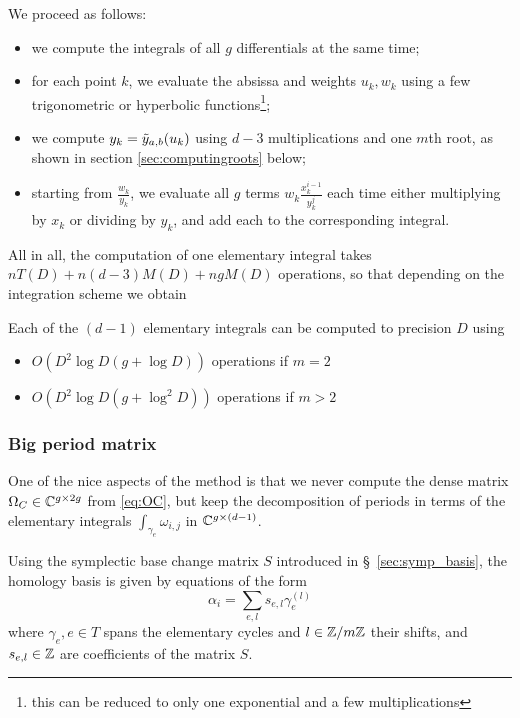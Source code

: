 \documentclass[main.tex]{subfiles}
\begin{document}
   We proceed as follows:
   \begin{itemize}
       \item we compute the integrals of all $g$ differentials at the same time;
   \item for each point $k$, we evaluate the absissa and weights $u_k,w_k$ using
       a few trigonometric or hyperbolic functions\footnote{this can be reduced to only one exponential
       and a few multiplications};
   \item we compute $y_k=\tilde{y}_{a,b}(u_k)$ using $d-3$ multiplications and one $m$th root,
       as shown in section \ref{sec:computingroots} below;
   \item starting from $\frac{w_k}{y_k}$, we evaluate all $g$ terms $w_k\frac{x_k^{i-1}}{y_k^j}$
       each time either multiplying by $x_k$ or dividing by $y_k$, and add each to the corresponding
       integral.
   \end{itemize}

   All in all, the computation of one elementary integral takes $nT(D)+n(d-3)M(D)+ngM(D)$ operations,
   so that depending on the integration scheme we obtain
   \begin{thm}
       \label{thm:complexity_integrals}
       Each of the $(d-1)$ elementary integrals can be computed to precision $D$ using
       \begin{itemize}
           \item $O(D^2\log D (g + \log D))$ operations if $m=2$
           \item $O(D^2\log D (g + \log^2 D))$ operations if $m>2$
       \end{itemize}
   \end{thm}

   \subsubsection{Big period matrix}

   One of the nice aspects of the method is that we never compute
   the dense matrix $\Omega_C\in\mathbb{C}^{g\times 2g}$ from \eqref{eq:OC}, but
   keep the decomposition of periods in terms of the elementary integrals
   $\int_{\gamma_e}\omega_{i,j}$ in $\mathbb{C}^{g\times (d-1)}$.

   Using the symplectic base change matrix $S$ introduced
   in \S~\ref{sec:symp_basis}, the homology basis is given
   by equations of the form
   \begin{equation}
       \label{eq:base_change_cycles}
       \alpha_i = \sum_{e,l} s_{e,l}\gamma_e^{(l)}
   \end{equation}
   where $\gamma_e,e\in T$ spans the elementary cycles
   and $l\in\mathbb{Z}/m\mathbb{Z}$ their shifts,
   and $s_{e,l}\in\mathbb{Z}$ are coefficients of the matrix $S$. 
\end{document}
